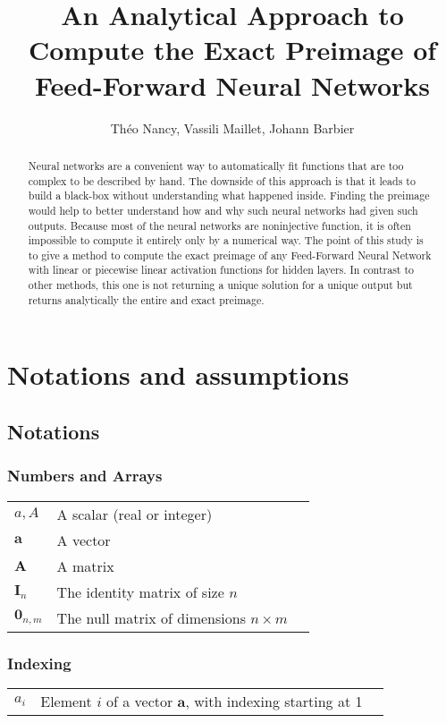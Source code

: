 \documentclass{article}
\title{An Analytical Approach to Compute the Exact Preimage of Feed-Forward Neural Networks}
\author{Théo Nancy, Vassili Maillet, Johann Barbier }
\begin{document}
\maketitle

\begin{abstract}
    Neural networks are a convenient way to automatically fit functions that are too complex to be described by hand. 
    The downside of this approach is that it leads to build a black-box without understanding what happened inside. 
    Finding the preimage would help to better understand how and why such neural networks had given such outputs. 
    Because most of the neural networks are noninjective function, it is often impossible to compute it entirely only by a numerical way. 
    The point of this study is to give a method to compute the exact preimage of any Feed-Forward Neural Network with linear or piecewise 
    linear activation functions for hidden layers. In contrast to other methods, this one is not returning a unique solution for a unique output 
    but returns analytically the entire and exact preimage.
\end{abstract}

\newpage
\section*{Notations and assumptions}
\subsection*{Notations}
\subsubsection*{Numbers and Arrays}

 \begin{tabular}{p{2cm}p{10cm}p{1cm}}
    $a,A$   & A scalar (real or integer)\\
    $\textbf{a}$  & A vector \\
    $\textbf{A}$  & A matrix\\
    $\textbf{I}_{n}$  & The identity matrix of size $n$\\
    $\textbf{0}_{n,m}$  & The null matrix of dimensions $n \times m$
    \end{tabular}
    
\subsubsection*{Indexing}
\begin{tabular}{p{2cm}p{10cm}p{1cm}}
    $a_{i}$   & Element $i$ of a vector $\textbf{a}$, with indexing starting at 1\\
    \end{tabular}
\end{document}
